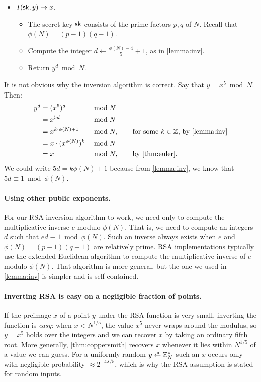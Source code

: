 \begin{itemize}
  \item $I({\mathsf{sk}}, y) \to x$.
\begin{itemize}
  \item The secret key ${\mathsf{sk}}$ consists of the prime factors $p,q$ of $N$.
        Recall that $\phi(N) = (p-1)(q-1)$.
  \item Compute the integer $d \gets \frac{\phi(N) - 4}{5} + 1$, as in
    \cref{lemma:inv}.

  \item Return $y^d \bmod N$.
\end{itemize}
\end{itemize}

It is not obvious why the inversion algorithm is correct.
Say that $y = x^5 \bmod N$.
Then:
\begin{align*}
  y^d &= (x^5)^d &&\bmod N\\
      &= x^{5d} &&\bmod N\\
&= x^{k \cdot \phi(N) + 1} &&\bmod N, \qquad \text{for some $k \in \Z$, by \cref{lemma:inv}}\\
        &= x \cdot (x^{\phi(N)})^k &&\bmod N\\
&= x &&\bmod N, \qquad\text{by \cref{thm:euler}}.\\
\end{align*}
We could write $5d = k \phi(N) + 1$ because from \cref{lemma:inv},
we know that $5d \equiv 1 \bmod \phi(N)$.

\paragraph{Using other public exponents.}
For our RSA-inversion algorithm to work, we need only to
compute the multiplicative inverse $e$ modulo $\phi(N)$.
That is, we need to compute an integers $d$ such that
$ed \equiv 1 \bmod \phi(N)$.
Such an inverse always exists when $e$ and $\phi(N)=(p-1)(q-1)$ are
relatively prime.
RSA implementations typically use the extended Euclidean
algorithm to compute the multiplicative inverse of $e$ modulo $\phi(N)$.
That algorithm is more general, but the one we used in \cref{lemma:inv}
is simpler and is self-contained.

\paragraph{Inverting RSA is easy on a negligible fraction of points.}
If the preimage $x$ of a point $y$ under the RSA function is very small,
inverting the function is \emph{easy}: when $x < N^{1/5}$, the value
$x^5$ never wraps around the modulus, so $y = x^5$ holds over the
integers and we can recover $x$ by taking an ordinary fifth root.
More generally, \cref{thm:coppersmith} recovers $x$ whenever it lies
within $N^{1/5}$ of a value we can guess.  For a uniformly random
$y \getsr \Z^*_N$ such an $x$ occurs only with negligible
probability $\approx 2^{-4\lambda/5}$, which is why the RSA assumption
is stated for random inputs.


